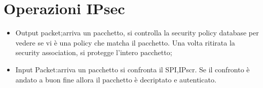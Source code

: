 \documentclass{book}
\theoremstyle{remark}
\begin{document}
\section{Operazioni IPsec}
\begin{itemize}
	\item Output packet;\@appena arriva un pacchetto, si controlla la security policy database per vedere se vi è una policy che matcha il pacchetto\@. Una volta ritirata la security association, si protegge l'intero pacchetto;\@
	\item Input Packet:\@appena arriva un pacchetto si confronta il SPI,IPscr\@. Se il confronto è andato a buon fine allora il pacchetto è decriptato e autenticato\@.
\end{itemize}
\end{document}
